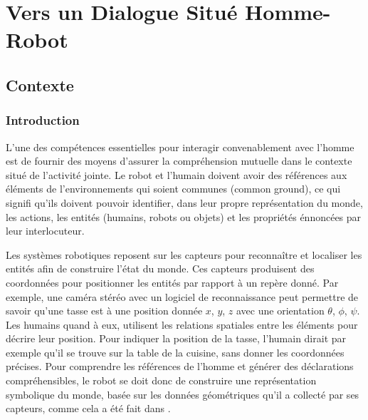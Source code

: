 \documentclass[a4paper,11pt,twoside]{StyleThese}
\begin{document}
\setcounter{chapter}{2} %
\dominitoc
\faketableofcontents
\fi

\chapter{Vers un Dialogue Situé Homme-Robot}
\label{chapter3}
\minitoc

\section{Contexte}

\subsection{Introduction}
L'une des compétences essentielles pour interagir convenablement avec l'homme est de fournir des moyens d'assurer la compréhension mutuelle dans le contexte situé de l'activité jointe. Le robot et l'humain doivent avoir des références aux éléments de l'environnements qui soient communes (common ground), ce qui signifi qu'ils doivent pouvoir identifier, dans leur propre représentation du monde, les actions, les entités (humains, robots ou objets) et les propriétés énnoncées par leur interlocuteur.

Les systèmes robotiques reposent sur les capteurs pour reconnaître et localiser les entités afin de construire l'état du monde. Ces capteurs produisent des coordonnées pour positionner les entités par rapport à un repère donné. Par exemple, une caméra stéréo avec un logiciel de reconnaissance peut permettre de savoir qu'une tasse est à une position donnée  $x$, $y$, $z$ avec une orientation $\theta$, $\phi$, $\psi$.
Les humains quand à eux, utilisent les relations spatiales entre les éléments pour décrire leur position. Pour indiquer la position de la tasse, l'humain dirait par exemple qu'il se trouve sur la table de la cuisine, sans donner les coordonnées précises.
Pour comprendre les références de l'homme et générer des déclarations compréhensibles, le robot se doit donc de construire une représentation symbolique du monde, basée sur les données géométriques qu'il a collecté par ses capteurs, comme cela a été fait dans \cite{lemaignan2012grounding}.

\end{document}
